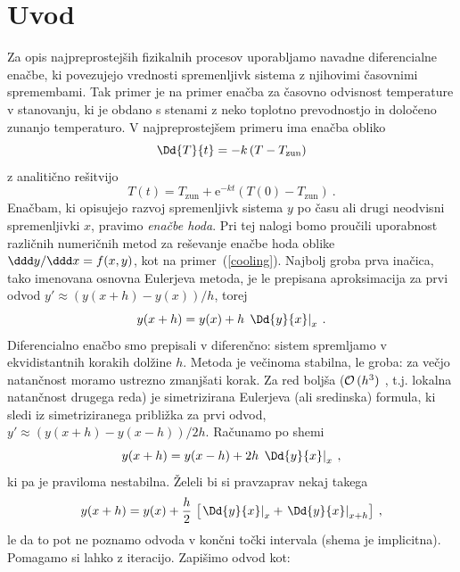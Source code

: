 \documentclass{article}
\begin{document}
\section{Uvod}
Za opis najpreprostejših fizikalnih procesov uporabljamo
navadne diferencialne enačbe, ki povezujejo vrednosti
spremenljivk sistema z njihovimi časovnimi
spremembami. Tak primer je na primer enačba za časovno
odvisnost temperature v stanovanju, ki je obdano s stenami
z neko toplotno prevodnostjo in določeno zunanjo temperaturo.
V najpreprostejšem primeru ima enačba obliko
\begin{equation}
\Dd{T}{t} = - k \left( T-T_\mathrm{zun} \right)
\label{cooling}
\end{equation}
z analitično rešitvijo
\begin{equation*}
T(t) = T_\mathrm{zun} + \mathrm{e}^{-kt} \left( T(0) - T_\mathrm{zun} \right) \>.
\end{equation*}
Enačbam, ki opisujejo razvoj spremenljivk sistema $y$ po času ali drugi
neodvisni spremenljivki $x$, pravimo {\sl enačbe hoda\/}.  Pri tej
nalogi bomo proučili uporabnost različnih numeričnih metod
za reševanje enačbe hoda oblike $\ddd y/\ddd x = f(x, y)$,
kot na primer~(\ref{cooling}).   Najbolj groba
prva inačica, tako imenovana osnovna Eulerjeva metoda,
je le prepisana aproksimacija za prvi odvod
$y' \approx (y(x+h) - y(x)) / h$, torej
\begin{equation}
y(x+h) = y(x) + h\,\left.\Dd{y}{x}\right|_x \>.
\label{euler}
\end{equation}
Diferencialno enačbo smo prepisali
v diferenčno: sistem
spremljamo v ekvidistantnih korakih dolžine $h$. Metoda je
večinoma stabilna, le groba: za večjo natančnost moramo
ustrezno zmanjšati korak.   Za red boljša (${\cal O}\,(h^3 )$ , t.j. lokalna natančnost drugega reda)
je simetrizirana Eulerjeva (ali sredinska) formula, ki sledi
iz simetriziranega približka za prvi odvod,
$y' \approx (y(x+h) - y(x-h)) / 2h$.  Računamo po shemi
\begin{equation}
y(x+h) = y(x-h) + 2h\,\left.\Dd{y}{x}\right|_x \>,
\label{seuler}
\end{equation}
ki pa je praviloma nestabilna.  Želeli bi si
pravzaprav nekaj takega
\begin{equation}
y(x+h) = y(x) + {h\over 2}\,\left[\left.\Dd{y}{x}\right|_x
+ \left.\Dd{y}{x}\right|_{x+h} \right] \>,
\label{impeuler}
\end{equation}
le da to pot ne poznamo odvoda v končni točki intervala
(shema je implicitna). Pomagamo si lahko z iteracijo.
Zapi\v simo odvod kot:
\end{document}
